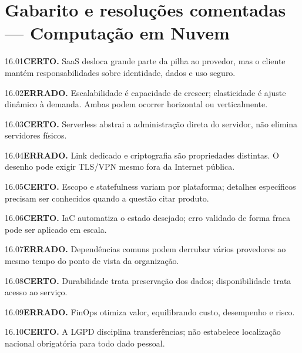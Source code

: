 \section{Gabarito e resoluções comentadas — Computação em Nuvem}

\begin{solucao}{16.01}\textbf{CERTO.} SaaS desloca grande parte da pilha ao provedor, mas o cliente mantém responsabilidades sobre identidade, dados e uso seguro.\end{solucao}
\begin{solucao}{16.02}\textbf{ERRADO.} Escalabilidade é capacidade de crescer; elasticidade é ajuste dinâmico à demanda. Ambas podem ocorrer horizontal ou verticalmente.\end{solucao}
\begin{solucao}{16.03}\textbf{CERTO.} Serverless abstrai a administração direta do servidor, não elimina servidores físicos.\end{solucao}
\begin{solucao}{16.04}\textbf{ERRADO.} Link dedicado e criptografia são propriedades distintas. O desenho pode exigir TLS/VPN mesmo fora da Internet pública.\end{solucao}
\begin{solucao}{16.05}\textbf{CERTO.} Escopo e statefulness variam por plataforma; detalhes específicos precisam ser conhecidos quando a questão citar produto.\end{solucao}
\begin{solucao}{16.06}\textbf{CERTO.} IaC automatiza o estado desejado; erro validado de forma fraca pode ser aplicado em escala.\end{solucao}
\begin{solucao}{16.07}\textbf{ERRADO.} Dependências comuns podem derrubar vários provedores ao mesmo tempo do ponto de vista da organização.\end{solucao}
\begin{solucao}{16.08}\textbf{CERTO.} Durabilidade trata preservação dos dados; disponibilidade trata acesso ao serviço.\end{solucao}
\begin{solucao}{16.09}\textbf{ERRADO.} FinOps otimiza valor, equilibrando custo, desempenho e risco.\end{solucao}
\begin{solucao}{16.10}\textbf{CERTO.} A LGPD disciplina transferências; não estabelece localização nacional obrigatória para todo dado pessoal.\end{solucao}

